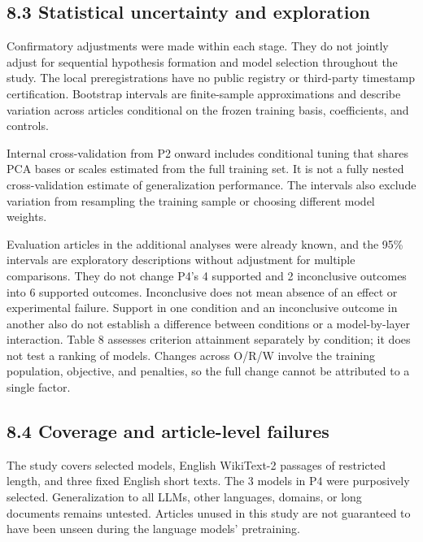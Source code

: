 \FloatBarrier

\subsection{8.3 Statistical uncertainty and exploration}\label{statistical-uncertainty-and-exploration}

Confirmatory adjustments were made within each stage. They do not jointly adjust for sequential hypothesis formation and model selection throughout the study. The local preregistrations have no public registry or third-party timestamp certification. Bootstrap intervals are finite-sample approximations and describe variation across articles conditional on the frozen training basis, coefficients, and controls.

Internal cross-validation from P2 onward includes conditional tuning that shares PCA bases or scales estimated from the full training set. It is not a fully nested cross-validation estimate of generalization performance. The intervals also exclude variation from resampling the training sample or choosing different model weights.

Evaluation articles in the additional analyses were already known, and the 95\% intervals are exploratory descriptions without adjustment for multiple comparisons. They do not change P4's 4 supported and 2 inconclusive outcomes into 6 supported outcomes. Inconclusive does not mean absence of an effect or experimental failure. Support in one condition and an inconclusive outcome in another also do not establish a difference between conditions or a model-by-layer interaction. Table 8 assesses criterion attainment separately by condition; it does not test a ranking of models. Changes across O/R/W involve the training population, objective, and penalties, so the full change cannot be attributed to a single factor.

\FloatBarrier

\subsection{8.4 Coverage and article-level failures}\label{coverage-and-article-level-failures}

The study covers selected models, English WikiText-2 passages of restricted length, and three fixed English short texts. The 3 models in P4 were purposively selected. Generalization to all LLMs, other languages, domains, or long documents remains untested. Articles unused in this study are not guaranteed to have been unseen during the language models' pretraining.


